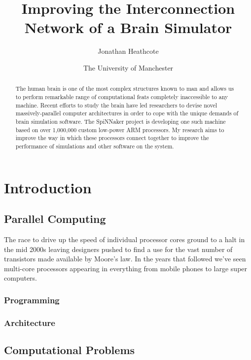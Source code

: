 \documentclass[a4paper,12pt,titlepage]{report}
\title{Improving the Interconnection Network of a Brain Simulator}
\author{Jonathan Heathcote}
\date{The University of Manchester}
\begin{document}
	
	\maketitle
	
	\begin{abstract}
		
		The human brain is one of the most complex structures known to man and
		allows us to perform remarkable range of computational feats completely
		inaccessible to any machine. Recent efforts to study the brain have led
		researchers to devise novel massively-parallel computer architectures in
		order to cope with the unique demands of brain simulation software. The
		SpiNNaker project is developing one such machine based on over 1,000,000
		custom low-power ARM processors. My research aims to improve the way in
		which these processors connect together to improve the performance of
		simulations and other software on the system.
		
	\end{abstract}
	
	\setcounter{tocdepth}{4}
	\tableofcontents
	
	
	
	\chapter{Introduction}
		
		\section{Parallel Computing}
			
			The race to drive up the speed of individual processor cores ground to a
			halt in the mid 2000s leaving designers pushed to find a use for the vast
			number of transistors made available by Moore's law. In the years that
			followed we've seen multi-core processors appearing in everything from
			mobile phones to large super computers.
				
			\subsection{Programming}
			
			\subsection{Architecture}
		
		\section{Computational Problems}
			
\end{document}
